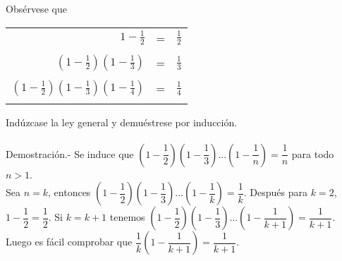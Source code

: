 \begin{ej}
Obsérvese que
\begin{center}
\begin{tabular}{r c l}
$1-\frac{1}{2}$&=&$\frac{1}{2}$\\\\
$(1-\frac{1}{2})(1-\frac{1}{3})$&=&$\frac{1}{3}$\\\\
$(1-\frac{1}{2})(1-\frac{1}{3})(1-\frac{1}{4})$&=&$\frac{1}{4}$\\\\
\end{tabular}
\end{center}
Indúzcase la ley general y demuéstrese por inducción.\\\\
Demostración.- \; Se induce que $\left( 1-\dfrac{1}{2} \right)\left( 1-\dfrac{1}{3} \right)...\left(1- \dfrac{1}{n} \right)=\dfrac{1}{n}$ para todo $n>1$.\\
Sea $n=k$, entonces $\left( 1-\dfrac{1}{2} \right)\left( 1-\dfrac{1}{3} \right)...\left(1- \dfrac{1}{k} \right)=\dfrac{1}{k}$. Después para $k=2$, \; $1-\dfrac{1}{2}=\dfrac{1}{2}$. Si $k=k+1$ tenemos $\left( 1-\dfrac{1}{2} \right) \left( 1-\dfrac{1}{3} \right)...\left(1- \dfrac{1}{k+1} \right)=\dfrac{1}{k+1}$. Luego es fácil comprobar que 
$\dfrac{1}{k}\left(1 - \dfrac{1}{k+1} \right)=\dfrac{1}{k+1}$. \\\\
\end{ej}


